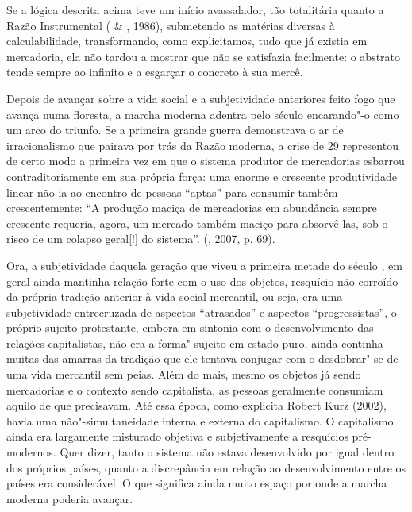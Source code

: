 Se a lógica descrita acima teve um início avassalador, tão totalitária
quanto a Razão Instrumental ( \& , 1986), submetendo as
matérias diversas à calculabilidade, transformando, como explicitamos,
tudo que já existia em mercadoria, ela não tardou a mostrar que não se
satisfazia facilmente: o abstrato tende sempre ao infinito e a esgarçar
o concreto à sua mercê.

Depois de avançar sobre a vida social e a subjetividade anteriores feito
fogo que avança numa floresta, a marcha moderna adentra pelo século 
encarando"-o como um arco do triunfo. Se a primeira grande guerra
demonstrava o ar de irracionalismo que pairava por trás da Razão
moderna, a crise de 29 representou de certo modo a primeira vez em que o
sistema produtor de mercadorias esbarrou contraditoriamente em sua
própria força: uma enorme e crescente produtividade linear não ia ao
encontro de pessoas ``aptas'' para consumir também crescentemente: ``A
produção maciça de mercadorias em abundância sempre crescente requeria,
agora, um mercado também maciço para absorvê-las, sob o risco de um
colapso geral[!] do sistema''. (, 2007, p. 69).

Ora, a subjetividade daquela geração que viveu a primeira metade do
século , em geral ainda mantinha relação forte com o uso dos objetos,
resquício não corroído da própria tradição anterior à vida social
mercantil, ou seja, era uma subjetividade entrecruzada de aspectos
``atrasados'' e aspectos ``progressistas'', o próprio sujeito
protestante, embora em sintonia com o desenvolvimento das relações
capitalistas, não era a forma"-sujeito em estado puro, ainda continha
muitas das amarras da tradição que ele tentava conjugar com o
desdobrar"-se de uma vida mercantil sem peias. Além do mais, mesmo os
objetos já sendo mercadorias e o contexto sendo capitalista, as pessoas
geralmente consumiam aquilo de que precisavam. Até essa época, como
explicita Robert Kurz (2002), havia uma não"-simultaneidade interna e
externa do capitalismo. O capitalismo ainda era largamente misturado
objetiva e subjetivamente a resquícios pré-modernos. Quer dizer, tanto o
sistema não estava desenvolvido por igual dentro dos próprios países,
quanto a discrepância em relação ao desenvolvimento entre os países era
considerável. O que significa ainda muito espaço por onde a marcha
moderna poderia avançar.

